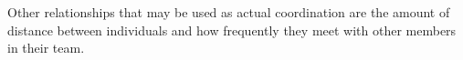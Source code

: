 \documentclass[12pt,oneside]{book}
\begin{document}
Other relationships that may be used as actual coordination are the amount of distance between individuals and how frequently they meet with other members in their team.





\end{document}
